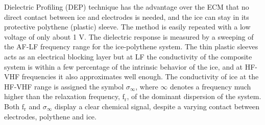 \documentclass[11pt]{article}
\begin{document}
Dielectric Profiling (DEP) technique has the advantage over the ECM that no direct contact between ice and electrodes is needed, and the ice can stay in its protective polythene (plastic) sleeve. The method is easily repeated with a low voltage of only about 1 V. The dielectric response is measured by a sweeping of the AF-LF frequency range for the ice-polythene system. The thin plastic sleeves acts as an electrical blocking layer but at LF the conductivity of the composite system is within a few percentage of the intrinsic behavior of the ice, and at HF-VHF frequencies it also approximates well enough. The conductivity of ice at the HF-VHF range is assigned the symbol $\sigma_{\infty}$, where $\infty$ denotes a frequency much higher than the relaxation frequency, $\text{f}_{\text{r}}$, of the dominant dispersion of the system. Both $\text{f}_{\text{r}}$ and $\sigma_{\infty}$ display a clear chemical signal, despite a varying contact between electrodes, polythene and ice.
\end{document}
